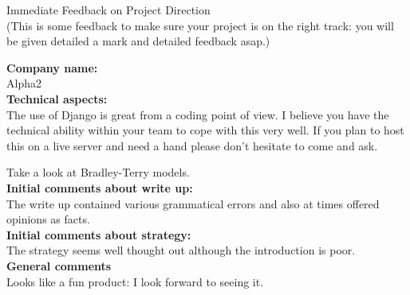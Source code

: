 \documentclass{article}
\begin{document}
\begin{center}
\Huge{Immediate Feedback on Project Direction}\\
\tiny{(This is some feedback to make sure your project is on the right track: you will be given detailed a mark and detailed feedback asap.)}
\end{center}


\normalsize
\textbf{Company name:}\\

Alpha2 \\

\textbf{Technical aspects:}\\

The use of Django is great from a coding point of view.
I believe you have the technical ability within your team to cope with this very well.
If you plan to host this on a live server and need a hand please don't hesitate to come and ask.

Take a look at Bradley-Terry models.
\\

\textbf{Initial comments about write up:}\\

The write up contained various grammatical errors and also at times offered opinions as facts. \\

\textbf{Initial comments about strategy:}\\

The strategy seems well thought out although the introduction is poor. \\

\textbf{General comments}\\

Looks like a fun product: I look forward to seeing it.
\end{document}
